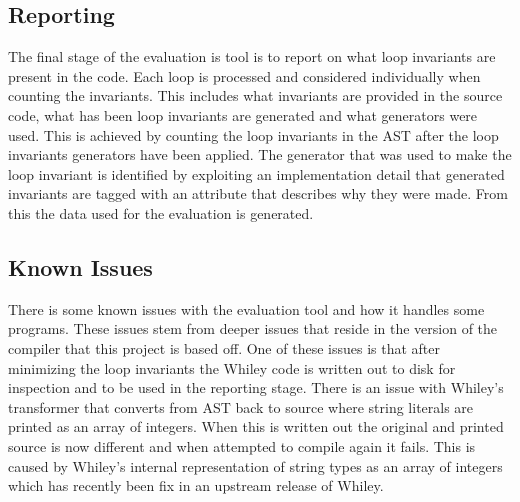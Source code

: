 \subsection{Reporting}

The final stage of the evaluation is tool is to report on what loop invariants
are present in the code.
Each loop is processed and considered individually when counting the
invariants.
This includes what invariants are provided in the source code, what has been
loop invariants are generated and what generators were used.
This is achieved by counting the loop invariants in the AST after the loop
invariants generators have been applied.
The generator that was used to make the loop invariant is identified by
exploiting an implementation detail that generated invariants are tagged
with an attribute that describes why they were made.
From this the data used for the evaluation is generated.

\subsection{Known Issues}

There is some known issues with the evaluation tool and how it handles some
programs.
These issues stem from deeper issues that reside in the version of the compiler
that this project is based off.
One of these issues is that after minimizing the loop invariants the Whiley
code is written out to disk for inspection and to be used in the reporting
stage. There is an issue with Whiley's transformer that converts from AST
back to source where string literals are printed as an array of integers.
When this is written out the original and printed source is now different
and when attempted to compile again it fails.
This is caused by Whiley's internal representation of string types as an array
of integers which has recently been fix in an upstream release of Whiley.

